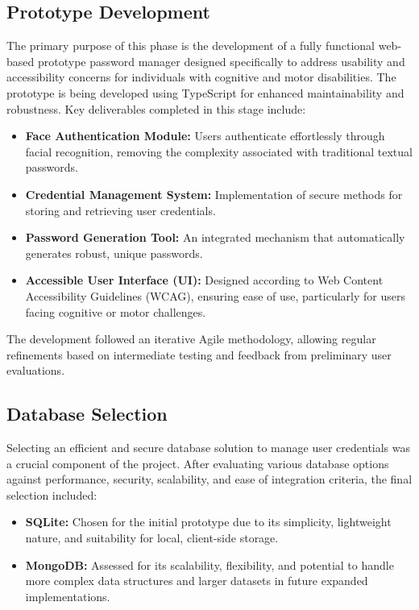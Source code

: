 \subsection{Prototype Development}
The primary purpose of this phase is the development of a fully functional web-based prototype password manager designed specifically to address usability and accessibility concerns for individuals with cognitive and motor disabilities. The prototype is being developed using TypeScript for enhanced maintainability and robustness. Key deliverables completed in this stage include:
\begin{itemize}
\item \textbf{Face Authentication Module:} Users authenticate effortlessly through facial recognition, removing the complexity associated with traditional textual passwords.
\item \textbf{Credential Management System:} Implementation of secure methods for storing and retrieving user credentials.
\item \textbf{Password Generation Tool:} An integrated mechanism that automatically generates robust, unique passwords.
\item \textbf{Accessible User Interface (UI):} Designed according to Web Content Accessibility Guidelines (WCAG), ensuring ease of use, particularly for users facing cognitive or motor challenges.
\end{itemize}

The development followed an iterative Agile methodology, allowing regular refinements based on intermediate testing and feedback from preliminary user evaluations.

\subsection{Database Selection}
Selecting an efficient and secure database solution to manage user credentials was a crucial component of the project. After evaluating various database options against performance, security, scalability, and ease of integration criteria, the final selection included:
\begin{itemize}
\item \textbf{SQLite:} Chosen for the initial prototype due to its simplicity, lightweight nature, and suitability for local, client-side storage.
\item \textbf{MongoDB:} Assessed for its scalability, flexibility, and potential to handle more complex data structures and larger datasets in future expanded implementations.
\end{itemize}

